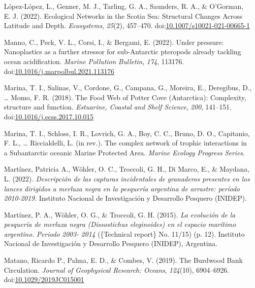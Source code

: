 \documentclass[
]{article}
\newlength{\cslhangindent}
\newlength{\cslentryspacingunit} %
\newenvironment{CSLReferences}[2] %
 {%
  \setlength{\parindent}{0pt}
  \ifodd #1
  \let\oldpar\par
  \def\par{\hangindent=\cslhangindent\oldpar}
  \fi
  \setlength{\parskip}{#2\cslentryspacingunit}
 }%
 {}
\begin{document}
\begin{CSLReferences}{1}{0}
\leavevmode{}%
López-López, L., Genner, M. J., Tarling, G. A., Saunders, R. A., \&
O'Gorman, E. J. (2022). Ecological {Networks} in the {Scotia Sea}:
{Structural Changes Across Latitude} and {Depth}. \emph{Ecosystems},
\emph{25}(2), 457--470.
doi:\href{https://doi.org/10.1007/s10021-021-00665-1}{10.1007/s10021-021-00665-1}

\leavevmode{}%
Manno, C., Peck, V. L., Corsi, I., \& Bergami, E. (2022). Under
pressure: {Nanoplastics} as a further stressor for sub-{Antarctic}
pteropods already tackling ocean acidification. \emph{Marine Pollution
Bulletin}, \emph{174}, 113176.
doi:\href{https://doi.org/10.1016/j.marpolbul.2021.113176}{10.1016/j.marpolbul.2021.113176}

\leavevmode{}%
Marina, T. I., Salinas, V., Cordone, G., Campana, G., Moreira, E.,
Deregibus, D., \ldots{} Momo, F. R. (2018). The {Food Web} of {Potter
Cove} ({Antarctica}): Complexity, structure and function.
\emph{Estuarine, Coastal and Shelf Science}, \emph{200}, 141--151.
doi:\href{https://doi.org/10.1016/j.ecss.2017.10.015}{10.1016/j.ecss.2017.10.015}

\leavevmode{}%
Marina, T. I., Schloss, I. R., Lovrich, G. A., Boy, C. C., Bruno, D. O.,
Capitanio, F. L., \ldots{} Riccialdelli, L. (in rev.). The complex
network of trophic interactions in a {Subantarctic} oceanic {Marine
Protected Area}. \emph{Marine Ecology Progress Series}.

\leavevmode{}%
Martínez, Patricia A., Wöhler, O. C., Troccoli, G. H., Di Marco, E., \&
Maydana, L. (2022). \emph{{Descripción de las capturas incidentales de
granaderos presentes en los lances dirigidos a merluza negra en la
pesquería argentina de arrastre: período 2010-2019.}} {Instituto
Nacional de Investigación y Desarrollo Pesquero (INIDEP)}.

\leavevmode{}%
Martínez, P. A., Wöhler, O. G., \& Troccoli, G. H. (2015). \emph{{La
evolución de la pesquería de merluza negra (Dissostichus eleginoides) en
el espacio marítimo argentino. Periodo 2003- 2014}} (\{Technical
report\} No. 11/15) (p. 12). {Instituto Nacional de Investigación y
Desarrollo Pesquero (INIDEP), Argentina}.

\leavevmode{}%
Matano, Ricardo P., Palma, E. D., \& Combes, V. (2019). The {Burdwood
Bank Circulation}. \emph{Journal of Geophysical Research: Oceans},
\emph{124}(10), 6904--6926.
doi:\href{https://doi.org/10.1029/2019JC015001}{10.1029/2019JC015001}


\end{CSLReferences}
\end{document}
